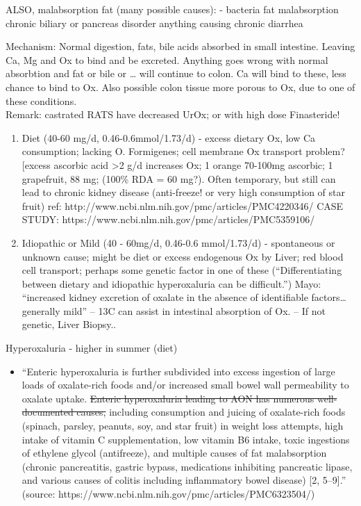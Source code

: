 ALSO, malabsorption fat (many possible causes): - bacteria \textbar{}
fat malabsorption \textbar{} chronic biliary or pancreas disorder
\textbar{} anything causing chronic diarrhea

Mechanism: Normal digestion, fats, bile acids absorbed in small
intestine. Leaving Ca, Mg and Ox to bind and be excreted. Anything goes
wrong with normal absorbtion and fat or bile or \ldots{} will continue
to colon. Ca will bind to these, less chance to bind to Ox. Also
possible colon tissue more porous to Ox, due to one of these
conditions.\\
Remark: castrated RATS have decreased UrOx; or with high dose
Finasteride!

\begin{enumerate}
\def\labelenumi{\arabic{enumi}.}
\setcounter{enumi}{2}
\item
  Diet (40-60 mg/d, 0.46-0.6mmol/1.73/d) - excess dietary Ox, low Ca
  consumption; lacking O. Formigenes; cell membrane Ox transport
  problem? {[}excess ascorbic acid \textgreater2 g/d increases Ox; 1
  orange 70-100mg ascorbic; 1 grapefruit, 88 mg; (100\% RDA = 60 mg?).
  Often temporary, but still can lead to chronic kidney disease
  (anti-freeze! or very high consumption of star fruit) ref:
  http://www.ncbi.nlm.nih.gov/pmc/articles/PMC4220346/ CASE STUDY:
  https://www.ncbi.nlm.nih.gov/pmc/articles/PMC5359106/
\item
  Idiopathic or Mild (40 - 60mg/d, 0.46-0.6 mmol/1.73/d) - spontaneous
  or unknown cause; might be diet or excess endogenous Ox by Liver; red
  blood cell transport; perhaps some genetic factor in one of these
  (``Differentiating between dietary and idiopathic hyperoxaluria can be
  difficult.'') Mayo: ``increased kidney excretion of oxalate in the
  absence of identifiable factors\ldots generally mild'' -- 13C can
  assist in intestinal absorption of Ox. -- If not genetic, Liver
  Biopsy..
\end{enumerate}

Hyperoxaluria - higher in summer (diet)

\begin{itemize}
\tightlist
\item
  ``Enteric hyperoxaluria is further subdivided into excess ingestion of
  large loads of oxalate-rich foods and/or increased small bowel wall
  permeability to oxalate uptake. \sout{Enteric hyperoxaluria leading to
  AON has numerous well-documented causes,} including consumption and
  juicing of oxalate-rich foods (spinach, parsley, peanuts, soy, and
  star fruit) in weight loss attempts, high intake of vitamin C
  supplementation, low vitamin B6 intake, toxic ingestions of ethylene
  glycol (antifreeze), and multiple causes of fat malabsorption (chronic
  pancreatitis, gastric bypass, medications inhibiting pancreatic
  lipase, and various causes of colitis including inflammatory bowel
  disease) {[}2, 5--9{]}.'' (source:
  https://www.ncbi.nlm.nih.gov/pmc/articles/PMC6323504/)
\end{itemize}

